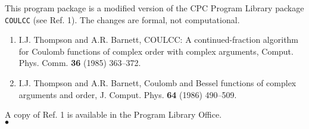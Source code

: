 \Source
This program package is a modified version of the CPC Program Library
package {\tt COULCC} (see Ref. 1). The changes are formal, not
computational.
\Refer
\begin{enumerate}
\item  I.J. Thompson and A.R. Barnett, COULCC: A
continued-fraction algorithm for Coulomb functions of complex order
with complex arguments, Comput. Phys. Comm. {\bf 36} (1985) 363--372.
\item I.J. Thompson and A.R. Barnett, Coulomb and Bessel functions of
complex arguments and order, J. Comput. Phys. {\bf 64} (1986) 490--509.
\end{enumerate}
\Longwr
A copy of Ref. 1 is available in the Program Library Office.
\\ $\bullet$
 
